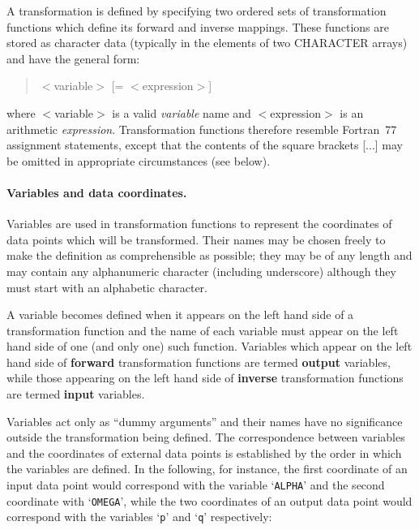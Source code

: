 \documentclass[twoside,nolof,11pt]{starlink}
\providecommand{\name}[1]{\small{#1}}
\begin{document}
A transformation is defined by specifying two ordered sets of transformation
functions which define its forward and inverse mappings.
These functions are stored as character data (typically in the elements of
two \name{CHARACTER} arrays) and have the general form:

\begin{quote}
$<$variable$>$ [= $<$expression$>$]
\end{quote}

where \mbox{$<$variable$>$} is a valid \emph{variable} name and
\mbox{$<$expression$>$} is an arithmetic \emph{expression}.
Transformation functions therefore resemble Fortran~77 assignment
statements, except that the contents of the square brackets \mbox{[...]} may
be omitted in appropriate circumstances (see below).

\paragraph{Variables and data coordinates.}
Variables are used in transformation functions to represent the coordinates
of data points which will be transformed.
Their names may be chosen freely to make the definition as comprehensible as
possible; they may be of any length and may contain any alphanumeric
character (including underscore) although they must start with an alphabetic
character.

A variable becomes defined when it appears on the left hand side of a
transformation function and the name of each variable must appear on the
left hand side of one (and only one) such function.
Variables which appear on the left hand side of \textbf{forward} transformation
functions are termed \textbf{output} variables, while those appearing on the
left hand side of \textbf{inverse} transformation functions are termed
\textbf{input} variables.

Variables act only as ``dummy arguments'' and their names have no
significance outside the transformation being defined.
The correspondence between variables and the coordinates of external data
points is established by the order in which the variables are defined.
In the following, for instance, the first coordinate of an input data point
would correspond with the variable `\verb#ALPHA#' and the second coordinate
with `\verb#OMEGA#', while the two coordinates of an output data point would
correspond with the variables `\verb#p#' and `\verb#q#' respectively:
\end{document}
